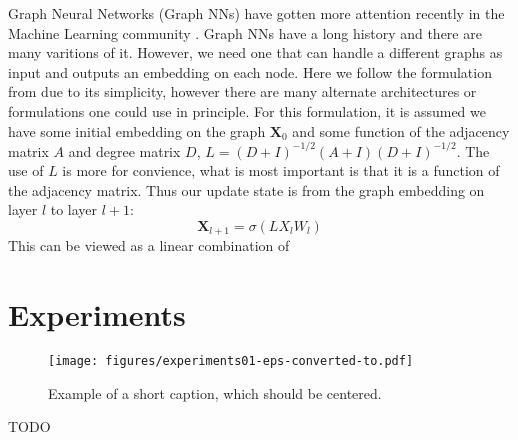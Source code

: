 \documentclass[10pt,twocolumn,letterpaper]{article}
\newcommand{\mat}[1]{\mathbf{#1}}
\begin{document}
Graph Neural Networks (Graph NNs) have gotten more attention recently in the Machine Learning community \cite{bronstein2017geometric, bruna2013spectral, defferrard2016convolutional, kipf2016semi, scarselli2009graph, gama2018mimo, gama2018convolutional}.
Graph NNs have a long history and there are many varitions of it. 
However, we need one that can handle a different graphs as input and outputs an embedding on each node.
Here we follow the formulation from \cite{kipf2016semi} due to its simplicity, however there are many alternate architectures or formulations one could use in principle.
For this formulation, it is assumed we have some initial embedding on the graph $\mat{X}_0$ and some function of the adjacency matrix $A$ and degree matrix $D$, $L = (D+I)^{-1/2}(A+I)(D+I)^{-1/2}$.
The use of $L$ is more for convience, what is most important is that it is a function of the adjacency matrix.
Thus our update state is from the graph embedding on layer $l$ to layer $l + 1$:
\begin{equation*}
\mat{X}_{l+1} = \sigma\left( L X_l W_l \right)
\label{eq:gnnupdate}
\end{equation*}
This can be viewed as a linear combination of 


\section{Experiments}

\begin{figure*}
\begin{center}
  \texttt{[image: figures/experiments01-eps-converted-to.pdf]}
  \end{center}
     \caption{Example of a short caption, which should be centered.}
  \label{fig:short}
\end{figure*}

TODO
\end{document}
